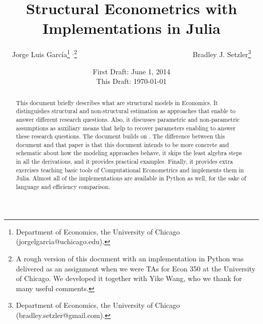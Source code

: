 



\title{\textbf{Structural Econometrics with Implementations in Julia}}
\author{Jorge Luis Garc\'{i}a\thanks{Department of Economics, the University of Chicago (jorgelgarcia@uchicago.edu).} $^{,}$\thanks{A rough version of this document with an implementation in Python was delivered as an assignment when we were TAs for Econ 350 at the University of Chicago. We developed it together with Yike Wang, who we thank for many useful comments.} \ \ \ \ \ \ \ \ \ \ \ \ \ \ \ \ \ \ \ \ \ \ \ \ \ \ \ \ \ \ \ \ Bradley J. Setzler\thanks{Department of Economics, the University of Chicago (bradley.setzler@gmail.com).}}
\date{First Draft: June 1, 2014 \\ This Draft: \today}
\maketitle

\begin{abstract}
\noindent This document briefly describes what are structural models in Economics. It distinguishes structural and non-structural estimation as approaches that enable to answer different research questions. Also, it discusses parametric and non-parametric assumptions as auxiliary means that help to recover parameters enabling to answer these research questions. The document builds on \citet{keane2011structural}. The difference between this document and that paper is that this document intends to be more concrete and schematic about how the modeling approaches behave, it skips the least algebra steps in all the derivations, and it provides practical examples. Finally, it provides extra exercises teaching basic tools of Computational Econometrics and implements them in Julia. Almost all of the implementations are available in Python as well, for the sake of language and efficiency comparison.
\end{abstract}





\clearpage


\clearpage









